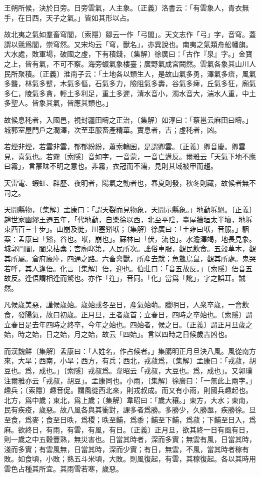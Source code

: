 王朔所候，決於日旁。日旁雲氣，人主象。〔正義〕洛書云：「有雲象人，青衣無手，在日西，天子之氣。」皆如其形以占。

故北夷之氣如羣畜穹閭，〔索隱〕鄒云一作「弓閭」。天文志作「弓」字，音穹。蓋謂以氈爲閭，崇穹然。又宋均云「穹，獸名」，亦異說也。南夷之氣類舟舩幡旗。大水處，敗軍場，破國之虛，下有積錢，〔集解〕徐廣曰：「古作『泉』字。」金寶之上，皆有氣，不可不察。海旁蜄氣象樓臺；廣野氣成宮闕然。雲氣各象其山川人民所聚積。〔正義〕淮南子云：「土地各以類生人，是故山氣多勇，澤氣多瘖，風氣多聾，林氣多躄，木氣多傴，石氣多力，險阻氣多壽，谷氣多痺，丘氣多狂，廟氣多仁，陵氣多貪，輕土多利足，重土多遲，清水音小，濁水音大，湍水人重，中土多聖人。皆象其氣，皆應其類也。」

故候息秏者，入國邑，視封疆田疇之正治，〔集解〕如淳曰：「蔡邕云麻田曰疇。」城郭室屋門戶之潤澤，次至車服畜產精華。實息者，吉；虛秏者，凶。

若煙非煙，若雲非雲，郁郁紛紛，蕭索輪囷，是謂卿雲。〔正義〕卿音慶。卿雲見，喜氣也。若霧〔索隱〕音如字，一音蒙，一音亡遘反。爾雅云「天氣下地不應曰霧」，言蒙昧不明之意也。非霧，衣冠而不濡，見則其域被甲而趨。

天雷電、蝦虹、辟歷、夜明者，陽氣之動者也，春夏則發，秋冬則藏，故候者無不司之。

天開縣物，〔集解〕孟康曰：「謂天裂而見物象，天開示縣象。」地動坼絕。〔正義〕趙世家幽繆王遷五年，「代地動，自樂徐以西，北至平陰，臺屋牆垣太半壞，地坼東西百三十步」。山崩及徙，川塞谿垘；〔集解〕徐廣曰：「土雍曰垘，音服。」駰案：孟康曰「谿，谷也。垘，崩也」。蘇林曰「伏，流也」。水澹澤竭，地長見象。城郭門閭，閨臬枯稾；宮廟邸第，人民所次。謠俗車服，觀民飲食。五穀草木，觀其所屬。倉府廄庫，四通之路。六畜禽獸，所產去就；魚龞鳥鼠，觀其所處。鬼哭若呼，其人逢俉。化言〔集解〕俉，迎也。伯莊曰：「音五故反。」〔索隱〕俉音五故反。逢俉謂相逢而驚也。亦作「迕」，音同。「化」當爲「訛」，字之誤耳。誠然。

凡候歲美惡，謹候歲始。歲始或冬至日，產氣始萌。臘明日，人衆卒歲，一會飲食，發陽氣，故曰初歲。正月旦，王者歲首；立春日，四時之卒始也。〔索隱〕謂立春日是去年四時之終卒，今年之始也。四始者，候之日。〔正義〕謂正月旦歲之始，時之始，日之始，月之始，故云「四始」。言以四時之日候歲吉凶也。

而漢魏鮮〔集解〕孟康曰：「人姓名，作占候者。」集臈明正月旦決八風。風從南方來，大旱；西南，小旱；西方，有兵；西北，戎菽爲，〔集解〕孟康曰：「戎菽，胡豆也。爲，成也。」〔索隱〕戎叔爲。韋昭云「戎叔，大豆也。爲，成也」。又郭璞注爾雅亦云「戎叔，胡豆」。孟康同也。小雨，〔集解〕徐廣曰：「一無此上兩字。」趣兵；〔索隱〕趣音促。謂風從西北來，則戎叔成。而又有小雨，則國兵趣起也。北方，爲中歲；東北，爲上歲；〔集解〕韋昭曰：「歲大穰。」東方，大水；東南，民有疾疫，歲惡。故八風各與其衝對，課多者爲勝。多勝少，久勝亟，疾勝徐。旦至食，爲麥；食至日昳，爲稷；昳至餔，爲黍；餔至下餔，爲菽；下餔至日入，爲麻。欲終日，有雨，有雲，有風，有日。〔正義〕正月旦，欲其終一日有風有日，則一歲之中五穀豐熟，無災害也。日當其時者，深而多實；無雲有風，日當其時，淺而多實；有雲風無，日當其時，深而少實；有日，無雲，不風，當其時者稼有敗。如食頃，小敗；熟五斗米頃，大敗。則風復起，有雲，其稼復起。各以其時用雲色占種其所宜。其雨雪若寒，歲惡。

